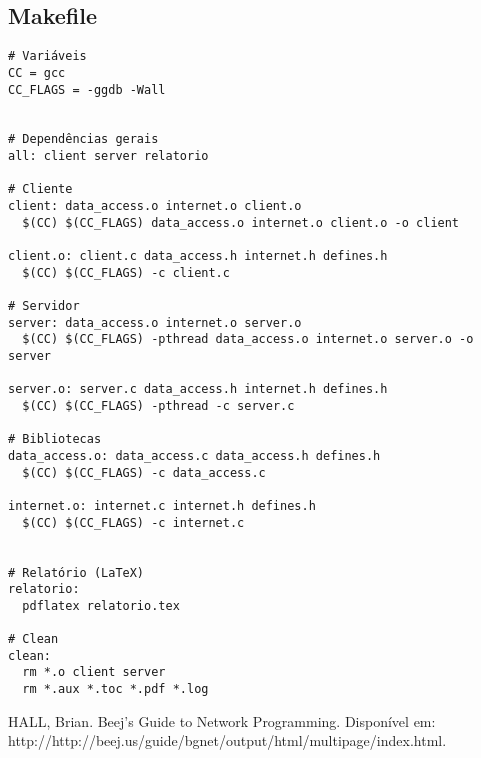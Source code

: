 \documentclass[11pt,twoside]{article}
\begin{document}
\subsection{Makefile}       %
\begin{verbatim}
# Variáveis
CC = gcc
CC_FLAGS = -ggdb -Wall


# Dependências gerais
all: client server relatorio

# Cliente
client: data_access.o internet.o client.o
  $(CC) $(CC_FLAGS) data_access.o internet.o client.o -o client

client.o: client.c data_access.h internet.h defines.h
  $(CC) $(CC_FLAGS) -c client.c

# Servidor
server: data_access.o internet.o server.o
  $(CC) $(CC_FLAGS) -pthread data_access.o internet.o server.o -o server

server.o: server.c data_access.h internet.h defines.h
  $(CC) $(CC_FLAGS) -pthread -c server.c

# Bibliotecas
data_access.o: data_access.c data_access.h defines.h
  $(CC) $(CC_FLAGS) -c data_access.c

internet.o: internet.c internet.h defines.h
  $(CC) $(CC_FLAGS) -c internet.c


# Relatório (LaTeX)
relatorio:
  pdflatex relatorio.tex

# Clean
clean:
  rm *.o client server
  rm *.aux *.toc *.pdf *.log
\end{verbatim}



\begin{thebibliography}{99}
 HALL, Brian. Beej's Guide to Network Programming. Disponível em: http://http://beej.us/guide/bgnet/output/html/multipage/index.html.
\end{thebibliography}
\end{document}
